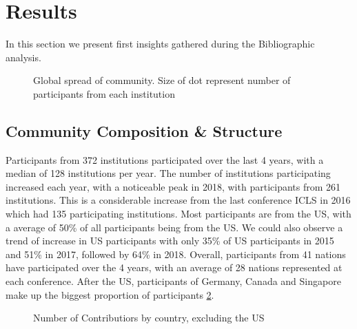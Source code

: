 \documentclass[article,twocolumn]{IEEEtran}
\begin{document}
    \hypertarget{results}{%
\section{Results}\label{results}}

In this section we present first insights gathered during the
Bibliographic analysis.



    \begin{figure}
        \begin{center}\end{center}
        \caption{Global spread of community. Size of dot represent number of participants from each institution}
        \label{global_com}
    \end{figure}
    
    \hypertarget{community-composition-structure}{%
\subsection{Community Composition \&
Structure}\label{community-composition-structure}}

Participants from 372 institutions participated over the last 4 years,
with a median of 128 institutions per year. The number of institutions
participating increased each year, with a noticeable peak in 2018, with
participants from 261 institutions. This is a considerable increase from
the last conference ICLS in 2016 which had 135 participating
institutions. Most participants are from the US, with a average of 50\%
of all participants being from the US. We could also observe a trend of
increase in US participants with only 35\% of US participants in 2015
and 51\% in 2017, followed by 64\% in 2018. Overall, participants from
41 nations have participated over the 4 years, with an average of 28
nations represented at each conference. After the US, participants of
Germany, Canada and Singapore make up the biggest proportion of
participants \ref{figrep}.


    \begin{figure}
        \begin{center}\end{center}
        \caption{Number of Contributiors by country, excluding the US}
        \label{figrep}
    \end{figure}
    
\end{document}
